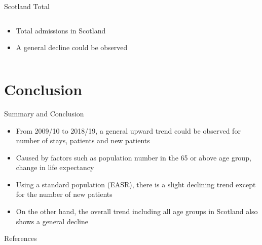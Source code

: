 \documentclass[hyperref={breaklinks,colorlinks,
   urlcolor=blue,citecolor=blue,linkcolor=red}]{beamer}
\begin{document}
\begin{frame}{Scotland Total}
\begin{columns}
\begin{column}{0.4\textwidth}
\begin{itemize}
\item{Total admissions in Scotland}
\item{A general decline could be observed}
\end{itemize}
\end{column}

\begin{column}{0.7\textwidth}
\end{column}
\end{columns}
\end{frame}


\section{Conclusion}
\begin{frame}{Summary and Conclusion}
\begin{itemize}
\item{From 2009/10 to 2018/19, a general upward trend could be observed for number of stays, patients and new patients}
\item{Caused by factors such as population number in the 65 or above age group, change in life expectancy}
\item{Using a standard population (EASR), there is a slight declining trend except for the number of new patients}
\item{On the other hand, the overall trend including all age groups in Scotland also shows a general decline}
\end{itemize}
\end{frame}





\begin{frame}[allowframebreaks]{References} 

%
%

%




\end{frame}
\end{document}
